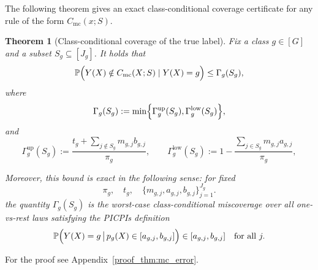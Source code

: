 \documentclass[11pt]{article}
\theoremstyle{statplain}
\newtheorem{theorem}{Theorem}[section]
\theoremstyle{statdefinition}
\newcommand{\mc}{\mathrm{mc}}
\newcommand{\PP}{\mathbb{P}}
\newcommand{\0}{\mathbf{0}}
\newcommand{\numClass}{G} %
\newcommand{\iteratorClass}{g}
\newcommand{\titleShorts}{PICPIs\xspace}
\begin{document}
The following theorem gives an exact class-conditional coverage certificate for any rule of the form $C_{\mc}(x;S)$.

\begin{theorem}[Class-conditional coverage of the true label]\label{thm:mc_error}
Fix a class $\iteratorClass\in[\numClass]$ and a subset $S_\iteratorClass\subseteq [J_\iteratorClass]$.
It holds that 
\begin{align}
\PP\Bigl(Y(X)\notin C_{\mc}(X;S)\mid Y(X)=\iteratorClass\Bigr)
\le
\Gamma_{\iteratorClass}(S_\iteratorClass),
\end{align}
where
\[
\Gamma_{\iteratorClass}(S_\iteratorClass)
:=
\min\Bigl\{
\Gamma_{\iteratorClass}^{\mathrm{up}}(S_\iteratorClass),
\Gamma_{\iteratorClass}^{\mathrm{low}}(S_\iteratorClass)
\Bigr\},
\]
and 
\[
\Gamma_{\iteratorClass}^{\mathrm{up}}(S_\iteratorClass)
:=
\frac{t_\iteratorClass+\sum_{j\notin S_\iteratorClass} m_{\iteratorClass,j} b_{\iteratorClass,j}}{\pi_\iteratorClass},
\qquad
\Gamma_{\iteratorClass}^{\mathrm{low}}(S_\iteratorClass)
:=
1-\frac{\sum_{j\in S_\iteratorClass} m_{\iteratorClass,j} a_{\iteratorClass,j}}{\pi_\iteratorClass},
\]



Moreover, this bound is exact in the following sense: for fixed
\[
\pi_\iteratorClass,\quad
t_\iteratorClass,\quad
\bigl\{m_{\iteratorClass,j},a_{\iteratorClass,j},b_{\iteratorClass,j}\bigr\}_{j=1}^{J_\iteratorClass}.
\]
the quantity $\Gamma_{\iteratorClass}(S_\iteratorClass)$ is the worst-case class-conditional miscoverage
over all one-vs-rest laws satisfying the \titleShorts definition
\[
\PP\Bigl(Y(X)=\iteratorClass \,\big|\, p_\iteratorClass(X)\in[a_{\iteratorClass,j},b_{\iteratorClass,j}]\Bigr)
\in [a_{\iteratorClass,j},b_{\iteratorClass,j}]
\quad \text{for all }j.
\]
\end{theorem}

For the proof see
Appendix~\ref{proof_thm:mc_error}.

\end{document}
